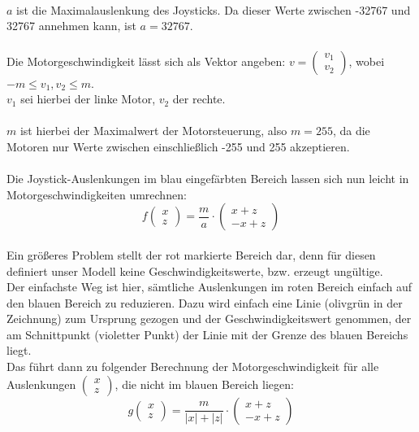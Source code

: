 \documentclass{article}
\begin{document}
\begin{tikzpicture}
\end{tikzpicture}\\
\\
\\
$a$ ist die Maximalauslenkung des Joysticks. Da dieser Werte zwischen -32767 und 32767 annehmen kann, ist $a=32767$.\\
\\
Die Motorgeschwindigkeit lässt sich als Vektor angeben: $v=\begin{pmatrix}v_1\\v_2\end{pmatrix}$, wobei $-m\leq v_1,v_2\leq m$.\\
$v_1$ sei hierbei der linke Motor, $v_2$ der rechte.\\
\\
$m$ ist hierbei der Maximalwert der Motorsteuerung, also $m=255$, da die Motoren nur Werte zwischen einschließlich -255 und 255 akzeptieren.\\
\\
Die Joystick-Auslenkungen im blau eingefärbten Bereich lassen sich nun leicht in Motorgeschwindigkeiten umrechnen:
\[
f\begin{pmatrix}x\\z\end{pmatrix}=\frac{m}{a}\cdot\begin{pmatrix}x+z\\-x+z\end{pmatrix}
\]
\\
Ein größeres Problem stellt der rot markierte Bereich dar, denn für diesen definiert unser Modell keine Geschwindigkeitswerte, bzw. erzeugt ungültige.\\
Der einfachste Weg ist hier, sämtliche Auslenkungen im roten Bereich einfach auf den blauen Bereich zu reduzieren. Dazu wird einfach eine Linie (olivgrün in der Zeichnung) zum Ursprung gezogen und der Geschwindigkeitswert genommen, der am Schnittpunkt (violetter Punkt) der Linie mit der Grenze des blauen Bereichs liegt.\\
Das führt dann zu folgender Berechnung der Motorgeschwindigkeit für alle Auslenkungen $\begin{pmatrix}x\\z\end{pmatrix}$, die nicht im blauen Bereich liegen:
\[
g\begin{pmatrix}x\\z\end{pmatrix}=\frac{m}{|x|+|z|}\cdot\begin{pmatrix}x+z\\-x+z\end{pmatrix}
\]
\end{document}
